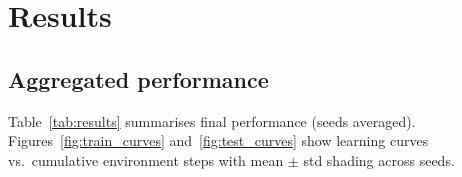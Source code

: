 \documentclass{article}
\begin{document}
\section{Results}
\label{sec:results}

\subsection{Aggregated performance}

Table~\ref{tab:results} summarises final performance (seeds averaged).
Figures~\ref{fig:train_curves} and~\ref{fig:test_curves} show learning curves
vs.\ cumulative environment steps with mean $\pm$ std shading across seeds.

\begin{table}[h]
  \caption{Performance at end of training (train = rectangle, test =
    network-field, seeds averaged).
    Train$_\mu$/Test$_\mu$: mean EWMA-50 return, with a $95\%$ bootstrap
    confidence interval on the mean ($B=10{,}000$ seed resamples);
    $n$ = number of seeds.
    This is the curated main set; the remaining \texttt{m1m2} scalar variants
    appear in Appendix~\ref{app:allmodes}.
    RAND is a random-action policy ($5$ seeds), included as a learning-free
    reference: modes below it do no better than random behaviour.}
  \label{tab:results}
  \centering\small
\end{table}
\end{document}
